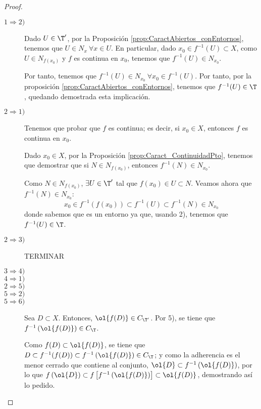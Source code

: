 \begin{proof}\
    \begin{description}
        \item[$1\Longrightarrow 2)$] Dado $U\in \T'$, por la Proposición \ref{prop:CaractAbiertos_conEntornos}, tenemos que $U\in N_x~\forall x\in U$. En particular, dado $x_0\in f^{-1}(U)\subset X$, como $U\in N_{f(x_0)}$ y $f$ es continua en $x_0$, tenemos que $f^{-1}(U)\in N_{x_0}$.

        Por tanto, tenemos que $f^{-1}(U)\in N_{x_0}~\forall x_0\in f^{-1}(U)$. Por tanto, por la proposición \ref{prop:CaractAbiertos_conEntornos}, tenemos que $f^{-1}(U)\in \T$, quedando demostrada esta implicación.

        \item[$2\Longrightarrow 1)$] Tenemos que probar que $f$ es continua; es decir, si $x_0\in X$, entonces $f$ es continua en $x_0$.

        Dado $x_0\in X$, por la Proposición \ref{prop:Caract_ContinuidadPto}, tenemos que demostrar que si $N\in N_{f(x_0)}$, entonces $f^{-1}(N)\in N_{x_0}$.

        Como $N\in N_{f(x_0)}$, $\exists U\in \T'$ tal que $f(x_0)\in U\subset N$. Veamos ahora que $f^{-1}(N)\in N_{x_0}$:
        \begin{equation*}
            x_0\in f^{-1}(f(x_0))\subset f^{-1}(U)\subset f^{-1}(N) \in N_{x_0}
        \end{equation*}
        donde sabemos que es un entorno ya que, usando 2), tenemos que $f^{-1}(U)\in \T$. 


        \item[$2\Longrightarrow 3)$] TERMINAR
        \item[$3\Longrightarrow 4)$]
        \item[$4\Longrightarrow 1)$]

        \item[$2\Longrightarrow 5)$]
        \item[$5\Longrightarrow 2)$]

        \item[$5\Longrightarrow 6)$] Sea $D\subset X$. Entonces, $\ol{f(D)}\in C_{\T'}$. Por 5), se tiene que $f^{-1}\left(\ol{f(D)}\right)\in C_\T$.

        Como $f(D)\subset \ol{f(D)}$, se tiene que $D\subset f^{-1}(f(D))\subset f^{-1}\left(\ol{f(D)}\right)\in C_\T$; y como la adherencia es el menor cerrado que contiene al conjunto, $\ol{D}\subset f^{-1}\left(\ol{f(D)}\right)$, por lo que $f\left(\ol{D}\right)\subset f\left[f^{-1}\left(\ol{f(D)}\right)\right]\subset \ol{f(D)}$, demostrando así lo pedido.
        

\end{description}
\end{proof}

